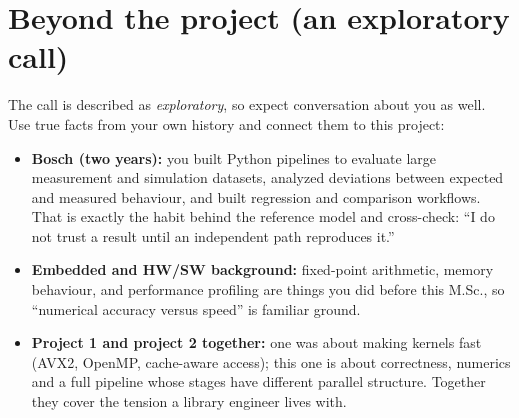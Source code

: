 


\section{Beyond the project (an exploratory call)}

The call is described as \emph{exploratory}, so expect conversation about you as well. Use true facts from your own history and connect them to this project:

\begin{itemize}
\item \textbf{Bosch (two years):} you built Python pipelines to evaluate large measurement and simulation datasets, analyzed deviations between expected and measured behaviour, and built regression and comparison workflows. That is exactly the habit behind the reference model and cross-check: ``I do not trust a result until an independent path reproduces it.''
\item \textbf{Embedded and HW/SW background:} fixed-point arithmetic, memory behaviour, and performance profiling are things you did before this M.Sc., so ``numerical accuracy versus speed'' is familiar ground.
\item \textbf{Project 1 and project 2 together:} one was about making kernels fast (AVX2, OpenMP, cache-aware access); this one is about correctness, numerics and a full pipeline whose stages have different parallel structure. Together they cover the tension a library engineer lives with.
\end{itemize}

